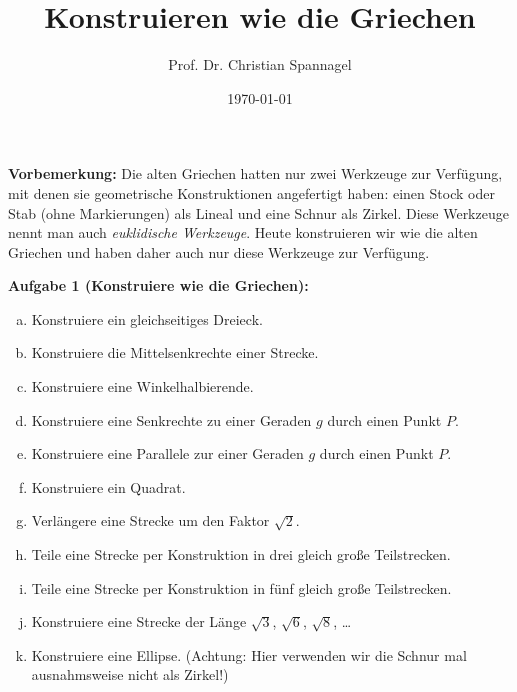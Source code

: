\documentclass{../cssheet}
\title{Konstruieren wie die Griechen}
\author{Prof. Dr. Christian Spannagel}
\date{\today}
\begin{document}
\printtitle

\textbf{Vorbemerkung:} Die alten Griechen hatten nur zwei Werkzeuge zur Verfügung, mit denen sie geometrische Konstruktionen angefertigt haben: einen Stock oder Stab (ohne Markierungen) als Lineal und eine Schnur als Zirkel. Diese Werkzeuge nennt man auch \emph{euklidische Werkzeuge}. Heute konstruieren wir wie die alten Griechen und haben daher auch nur diese Werkzeuge zur Verfügung.

\textbf{Aufgabe 1 (Konstruiere wie die Griechen):}  
\begin{enumerate}[a)]
\item Konstruiere ein gleichseitiges Dreieck.
\item Konstruiere die Mittelsenkrechte einer Strecke.
\item Konstruiere eine Winkelhalbierende.
\item Konstruiere eine Senkrechte zu einer Geraden $g$ durch einen Punkt $P$.
\item Konstruiere eine Parallele zur einer Geraden $g$ durch einen Punkt $P$.
\item Konstruiere ein Quadrat.
\item Verlängere eine Strecke um den Faktor $\sqrt{2}$.
\item Teile eine Strecke per Konstruktion in drei gleich große Teilstrecken.
\item Teile eine Strecke per Konstruktion in fünf gleich große Teilstrecken.
\item Konstruiere eine Strecke der Länge $\sqrt{3}$, $\sqrt{6}$, $\sqrt{8}$, \ldots
\item Konstruiere eine Ellipse. (Achtung: Hier verwenden wir die Schnur mal ausnahmsweise nicht als Zirkel!)
\end{enumerate}


\vspace*{10mm}

\printlicense

\printsocials
\end{document}
